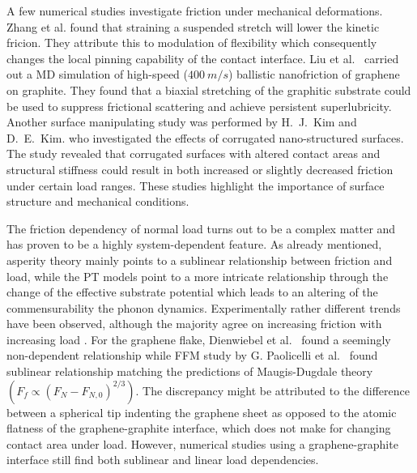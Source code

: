 A few numerical studies investigate friction under mechanical deformations. 
Zhang et al. \cite{zhang_tuning_2019} found that straining a suspended
stretch will lower the kinetic fricion. They attribute this to modulation of flexibility which consequently changes the local pinning capability of the contact interface. Liu et al.\ \cite{liu_high-speed_2014} carried out a \acrshort{MD} simulation of high-speed ($\SI{400}{m/s}$) ballistic nanofriction of graphene on graphite. They found that a biaxial stretching of the graphitic substrate could be used to suppress frictional scattering and achieve persistent superlubricity. Another surface manipulating study was performed by H.\ J.\ Kim and D.\ E.\ Kim. \cite{Kim_2012} who investigated the effects of corrugated
nano-structured surfaces. The study revealed that corrugated surfaces with altered contact areas and structural stiffness could result in both increased or slightly decreased friction under certain load ranges. These studies highlight the importance of surface structure and mechanical conditions. 


The friction dependency of normal load turns out to be a complex matter and has
proven to be a highly system-dependent feature. As already mentioned, asperity
theory mainly points to a sublinear relationship between friction and load,
while the \acrshort{PT} models point to a more intricate relationship through
the change of the effective substrate potential which leads to an altering of
the commensurability the phonon dynamics. Experimentally rather different trends
have been observed, although the majority agree on increasing friction with
increasing load \cite[p. 200]{gnecco_meyer_2015}. For the graphene flake,
Dienwiebel et al.\ \cite{DIENWIEBEL2005197} found a seemingly non-dependent
relationship while \acrshort{FFM} study by G. Paolicelli et al.\
\cite{Paolicelli_2015} found sublinear relationship matching the predictions of
Maugis-Dugdale theory $(F_f \propto (F_N - F_{N,0})^{2/3})$. The discrepancy
might be attributed to the difference between a spherical tip indenting the
graphene sheet as opposed to the atomic flatness of the graphene-graphite
interface, which does not make for changing contact area under load. However,
numerical studies using a graphene-graphite interface still find both sublinear
\cite{bonelli_atomistic_2009} and linear \cite{ma12091425, zhang_tuning_2019}
load dependencies. 

